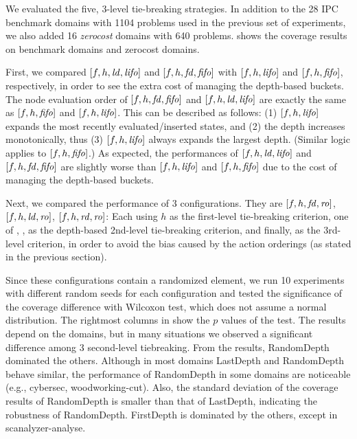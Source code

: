 We evaluated the five, 3-level tie-breaking strategies.
% 
In addition to the 28 IPC benchmark domains with 1104 problems used in the previous set of experiments, we also added 16 \emph{zerocost} domains with 640 problems. 
 shows the coverage results on benchmark domains and
zerocost domains.

First, we compared $[f,h,\mbox{\textit{ld}},\mbox{\textit{lifo}}]$ and $[f,h,\mbox{\textit{fd}},\mbox{\textit{fifo}}]$
with $[f,h,\mbox{\textit{lifo}}]$ and $[f,h,\mbox{\textit{fifo}}]$, respectively, in order to see
the extra cost of managing the depth-based buckets.
The node evaluation order of $[f,h,\mbox{\textit{fd}},\mbox{\textit{fifo}}]$ and $[f,h,\mbox{\textit{ld}},\mbox{\textit{lifo}}]$
are exactly the same as $[f,h,\mbox{\textit{fifo}}]$ and $[f,h,\mbox{\textit{lifo}}]$.
This can be described as follows:
(1) $[f,h,\mbox{\textit{lifo}}]$ expands the most recently evaluated/inserted
states, and (2) the depth increases monotonically,
thus (3) $[f,h,\mbox{\textit{lifo}}]$ always expands the largest depth. (Similar logic
applies to $[f,h,\mbox{\textit{fifo}}]$.)
% 
As expected, the performances of $[f,h,\mbox{\textit{ld}},\mbox{\textit{lifo}}]$ and
$[f,h,\mbox{\textit{fd}},\mbox{\textit{fifo}}]$ are slightly worse than $[f,h,\mbox{\textit{lifo}}]$ and
$[f,h,\mbox{\textit{fifo}}]$ due to the cost of managing the depth-based buckets.

Next, we compared the performance of 3 configurations.
They are $[f,h,\mbox{\textit{fd}},\mbox{\textit{ro}}]$, $[f,h,\mbox{\textit{ld}},\mbox{\textit{ro}}]$, $[f,h,\mbox{\textit{rd}},\mbox{\textit{ro}}]$: Each using
$h$ as the first-level tie-breaking criterion, one of \fd, \ld, \rd as
the depth-based 2nd-level tie-breaking criterion, and finally,
\ro as the 3rd-level criterion, in order to
avoid the bias caused by the action orderings (as stated in the previous
section).

Since these configurations contain a randomized element, we run 10
experiments with different random seeds for each configuration and
tested the significance of the coverage difference with Wilcoxon test,
which does not assume a normal distribution.  The rightmost columns in
 show the $p$ values of the test. The results depend on
the domains, but in many situations we observed a significant difference
among 3 second-level tiebreaking. From the results, RandomDepth
dominated the others. Although in most domains LastDepth and RandomDepth
behave similar, the performance of RandomDepth in some domains are
noticeable (e.g., cybersec, woodworking-cut). Also, the standard
deviation of the coverage results of RandomDepth is smaller than that
of LastDepth, indicating the robustness of RandomDepth.
FirstDepth is dominated by the others, except in
scanalyzer-analyse.

